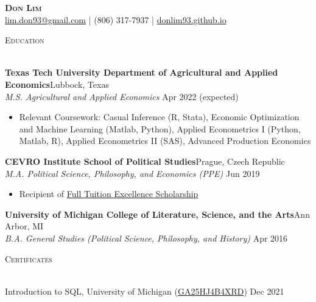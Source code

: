 \documentclass[a4paper,11pt]{article}
\newcommand{\lineunder} {
    \vspace*{-8pt} \\
    \hspace*{-18pt} \hrulefill \\
}
\newcommand{\header} [1] {
    {\hspace*{-18pt}\vspace*{6pt} \textsc{\large{#1}}}
    \vspace*{-6pt} \lineunder
}
\begin{document}
\vspace*{-40pt}

    

\vspace*{-10pt}
\begin{center}
	{\Huge \scshape \textbf{{Don Lim}}}\\
	\href{mailto:lim.don93@gmail.com}{lim.don93@gmail.com} | (806) 317-7937 | \href{https://donlim93.github.io/}{donlim93.github.io} \\
\end{center}

\header{Education}
\vspace{1mm}

\textbf{Texas Tech University Department of Agricultural and Applied Economics}\hfill Lubbock, Texas\\
\textit{M.S. Agricultural and Applied Economics} \hfill Apr 2022 (expected)\\
\begin{itemize}[noitemsep,nolistsep]
	\item Relevant Coursework: Casual Inference (R, Stata), Economic Optimization and Machine Learning (Matlab, Python), Applied Econometrics I (Python, Matlab, R), Applied Econometrics II (SAS), Advanced Production Economics
\end{itemize}
\vspace{1mm}
\textbf{CEVRO Institute School of Political Studies}\hfill Prague, Czech Republic\\
\textit{M.A. Political Science, Philosophy, and Economics (PPE)} \hfill Jun 2019\\
\begin{itemize}[noitemsep,nolistsep]
	\item Recipient of \href{http://www.cevroinstitut.cz/en/article/scholarships/}{Full Tuition Excellence Scholarship}
\end{itemize}
\vspace{1mm}
\textbf{University of Michigan College of Literature, Science, and the Arts}\hfill Ann Arbor, MI\\
\textit{B.A. General Studies (Political Science, Philosophy, and History)} \hfill Apr 2016\\
\vspace{2mm}

\header{Certificates}
\vspace{1mm}

Introduction to SQL, University of Michigan (\href{https://coursera.org/verify/GA25HJ4B4XRD}{GA25HJ4B4XRD}) \hfill Dec 2021
\vspace{2mm}
\end{document}
